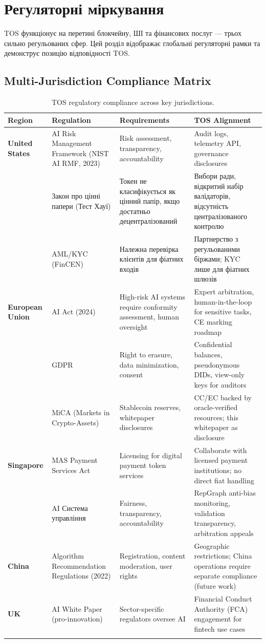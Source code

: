\documentclass[11pt]{article}
\begin{document}
\section{Регуляторні міркування}
\label{sec:regulatory}

TOS функціонує на перетині блокчейну, ШІ та фінансових послуг — трьох сильно регульованих сфер. Цей розділ відображає глобальні регуляторні рамки та демонструє позицію відповідності TOS.

\subsection{Multi-Jurisdiction Compliance Matrix}

\begin{longtable}{@{}p{}p{}p{}p{}@{}}
\toprule
\textbf{Region} & \textbf{Regulation} & \textbf{Requirements} & \textbf{TOS Alignment} \\\midrule
\textbf{United States} & AI Risk Management Framework (NIST AI RMF, 2023) & Risk assessment, transparency, accountability & Audit logs, telemetry API, governance disclosures \\
 & Закон про цінні папери (Тест Хауї) & Токен не класифікується як цінний папір, якщо достатньо децентралізований & Вибори ради, відкритий набір валідаторів, відсутність централізованого контролю \\
 & AML/KYC (FinCEN) & Належна перевірка клієнтів для фіатних входів & Партнерство з регульованими біржами; KYC лише для фіатних шлюзів \\
\textbf{European Union} & AI Act (2024) & High-risk AI systems require conformity assessment, human oversight & Expert arbitration, human-in-the-loop for sensitive tasks, CE marking roadmap \\
 & GDPR & Right to erasure, data minimization, consent & Confidential balances, pseudonymous DIDs, view-only keys for auditors \\
 & MiCA (Markets in Crypto-Assets) & Stablecoin reserves, whitepaper disclosures & CC/EC backed by oracle-verified resources; this whitepaper as disclosure \\
\textbf{Singapore} & MAS Payment Services Act & Licensing for digital payment token services & Collaborate with licensed payment institutions; no direct fiat handling \\
 & AI Система управління & Fairness, transparency, accountability & RepGraph anti-bias monitoring, validation transparency, arbitration appeals \\
\textbf{China} & Algorithm Recommendation Regulations (2022) & Registration, content moderation, user rights & Geographic restrictions; China operations require separate compliance (future work) \\
\textbf{UK} & AI White Paper (pro-innovation) & Sector-specific regulators oversee AI & Financial Conduct Authority (FCA) engagement for fintech use cases \\
\bottomrule
\caption{TOS regulatory compliance across key jurisdictions.}
\end{longtable}
\end{document}
